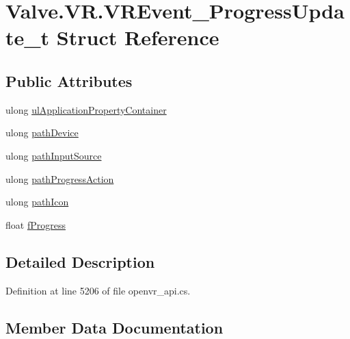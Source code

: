 \hypertarget{struct_valve_1_1_v_r_1_1_v_r_event___progress_update__t}{}\section{Valve.\+V\+R.\+V\+R\+Event\+\_\+\+Progress\+Update\+\_\+t Struct Reference}
\label{struct_valve_1_1_v_r_1_1_v_r_event___progress_update__t}
\subsection*{Public Attributes}
\begin{DoxyCompactItemize}
\item 
ulong \mbox{\hyperlink{struct_valve_1_1_v_r_1_1_v_r_event___progress_update__t_a32399aaa07f713f1569dca9010b000f2}{ul\+Application\+Property\+Container}}
\item 
ulong \mbox{\hyperlink{struct_valve_1_1_v_r_1_1_v_r_event___progress_update__t_ab984884997e9a9efe68dff2cd1f70226}{path\+Device}}
\item 
ulong \mbox{\hyperlink{struct_valve_1_1_v_r_1_1_v_r_event___progress_update__t_ac5f09a8960bdadd06ebc60d6805aacde}{path\+Input\+Source}}
\item 
ulong \mbox{\hyperlink{struct_valve_1_1_v_r_1_1_v_r_event___progress_update__t_a4d2773b65e40c48bc5297863a2d2d555}{path\+Progress\+Action}}
\item 
ulong \mbox{\hyperlink{struct_valve_1_1_v_r_1_1_v_r_event___progress_update__t_a91e861962940b36cd032b2b2436acbaf}{path\+Icon}}
\item 
float \mbox{\hyperlink{struct_valve_1_1_v_r_1_1_v_r_event___progress_update__t_a57a4f76957cbe7186a6d1a3f7ab9ef9d}{f\+Progress}}
\end{DoxyCompactItemize}


\subsection{Detailed Description}


Definition at line 5206 of file openvr\+\_\+api.\+cs.



\subsection{Member Data Documentation}
\mbox{\label{struct_valve_1_1_v_r_1_1_v_r_event___progress_update__t_a57a4f76957cbe7186a6d1a3f7ab9ef9d}} 
